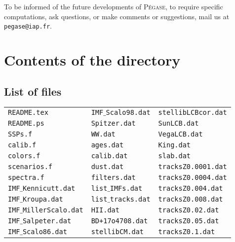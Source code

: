 \documentclass[11pt,draft,fleqn]{article}
\begin{document}
To be informed of the future developments of \textsc{P\'egase},
to require specific computations, ask questions, or make comments or 
suggestions, mail us at \texttt{pegase@iap.fr}.
\section{Contents of the directory}
\subsection{List of files}
\begin{tabular}{@{\hspace*{1cm}}l@{\hspace*{1cm}}l@{\hspace*{1cm}}l}
\texttt{README.tex}             & \texttt{IMF$\_$Scalo98.dat}      & \texttt{stellibLCBcor.dat}\\
\texttt{README.ps}              & \texttt{Spitzer.dat}             & \texttt{SunLCB.dat} \\        
\texttt{SSPs.f}                 & \texttt{WW.dat}                  & \texttt{VegaLCB.dat} \\       
\texttt{calib.f}                & \texttt{ages.dat}                & \texttt{King.dat} \\          
\texttt{colors.f}               & \texttt{calib.dat}               & \texttt{slab.dat} \\          
\texttt{scenarios.f}            & \texttt{dust.dat}                & \texttt{tracksZ0.0001.dat}\\  
\texttt{spectra.f}              & \texttt{filters.dat}             & \texttt{tracksZ0.0004.dat} \\ 
\texttt{IMF$\_$Kennicutt.dat}   & \texttt{list$\_$IMFs.dat}        & \texttt{tracksZ0.004.dat} \\  
\texttt{IMF$\_$Kroupa.dat}      & \texttt{list$\_$tracks.dat}      & \texttt{tracksZ0.008.dat} \\  
\texttt{IMF$\_$MillerScalo.dat} & \texttt{HII.dat}                 & \texttt{tracksZ0.02.dat} \\   
\texttt{IMF$\_$Salpeter.dat}    & \texttt{BD+17o4708.dat}          & \texttt{tracksZ0.05.dat} \\              
\texttt{IMF$\_$Scalo86.dat}     & \texttt{stellibCM.dat}           & \texttt{tracksZ0.1.dat}
\end{tabular}
\end{document}
